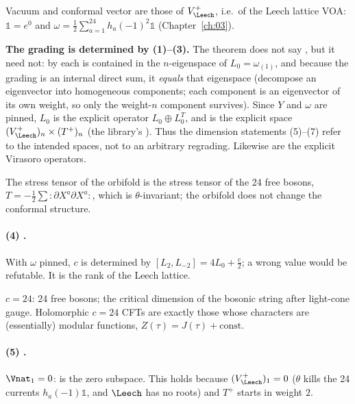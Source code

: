 \begin{dictionary}
Vacuum and conformal vector are those of $V_\Leech^+$, i.e.\ of the Leech lattice VOA: $\mathbb 1=e^0$ and
$\omega=\tfrac12\sum_{a=1}^{24}h_a(-1)^2\mathbb 1$ (Chapter~\ref{ch:03}).

\textbf{The grading is determined by (1)--(3).}  The theorem does not say , but
it need not: by  each  is contained in the $n$-eigenspace of
$L_0=\omega_{(1)}$, and because the grading is an internal direct sum, it \emph{equals} that eigenspace
(decompose an eigenvector into homogeneous components; each component is an eigenvector of its own
weight, so only the weight-$n$ component survives).  Since $Y$ and $\omega$ are pinned, $L_0$ is the explicit
operator $L_0\oplus L_0^T$, and  is the explicit space $(V_\Leech^+)_n\times(T^+)_n$
(the library's ).  Thus the dimension statements (5)--(7) refer to the intended spaces,
not to an arbitrary regrading.  Likewise  are the explicit Virasoro operators.
\end{dictionary}

\begin{physics}
The stress tensor of the orbifold is the stress tensor of the 24 free bosons, $T=-\tfrac12\sum:\partial X^a\partial X^a:$,
which is $\theta$-invariant; the orbifold does not change the conformal structure.
\end{physics}

\paragraph{(4) .}  With $\omega$ pinned, $c$ is determined by
$[L_2,L_{-2}]=4L_0+\tfrac c2$; a wrong value would be refutable.  It is the rank of the Leech lattice.

\begin{physics}
$c=24$: 24 free bosons; the critical dimension of the bosonic string after light-cone gauge.
Holomorphic $c=24$ CFTs are exactly those whose characters are (essentially) modular functions,
$Z(\tau)=J(\tau)+\text{const}$.
\end{physics}

\paragraph{(5) .}  $\Vnat_1=0$:  is the zero subspace.  This holds because
$(V_\Leech^+)_1=0$ ($\theta$ kills the 24 currents $h_a(-1)\mathbb 1$, and $\Leech$ has no roots) and $T^+$ starts in
weight $2$.

